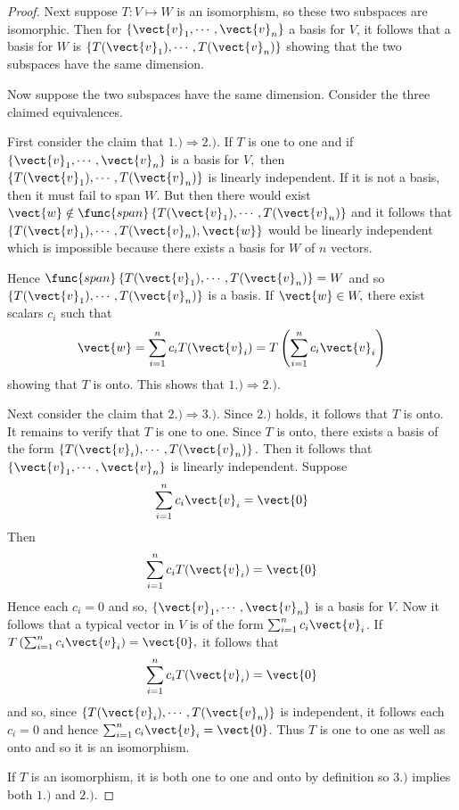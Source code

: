 \begin{proof}
Next suppose $T:V \mapsto W$ is an isomorphism, so these two subspaces are isomorphic. Then for $\left\{ \vect{v}_{1},\cdots ,\vect{v}_{n}\right\} $ a
basis for $V$, it follows that a basis for $W$
is $\left\{ T(\vect{v}_{1}),\cdots ,T(\vect{v}_{n})\right\} $ showing that the two
subspaces have the same dimension.

Now suppose the two subspaces have the same dimension. Consider the three
claimed equivalences.

First consider the claim that $1.)\Rightarrow 2.).$ If $T$ is one to one and if $\left\{ \vect{v}_{1},\cdots ,\vect{v}
_{n}\right\} $ is a basis for $V,$ then $\left\{ T(\vect{v}_{1}),\cdots ,T(\vect{v
}_{n})\right\} $ is linearly independent. If it is not a basis, then it must
fail to span $W$. But then there would exist $\vect{w}\notin \func{span}
\left\{ T(\vect{v}_{1}),\cdots ,T(\vect{v}_{n})\right\} $ and it follows that $\left\{ T(\vect{v}_{1}),\cdots ,T(\vect{v}_{n}),\vect{w}
\right\} $ would be linearly independent which is impossible because there exists a basis for $W$ of $n$ vectors.

Hence $\func{span}\left\{ T(\vect{v}_{1}),\cdots ,T(\vect{v}_{n})\right\} =W$ and
so $\left\{ T(\vect{v}_{1}),\cdots ,T(\vect{v}_{n})\right\} $ is a basis. If $\vect{w}\in W,$ there exist scalars $c_{i}$ such that 
\begin{equation*}
\vect{w}=\sum_{i=1}^{n}c_{i}T(\vect{v}_{i})=T\left( \sum_{i=1}^{n}c_{i}\vect{v}
_{i}\right)
\end{equation*}
showing that $T$ is onto. This shows that $1.)\Rightarrow 2.).$

Next consider the claim that $2.)\Rightarrow 3.).$ Since $2.)$ holds, it
follows that $T$ is onto. It remains to verify that $T$ is one to one. Since 
$T$ is onto, there exists a basis of the form $\left\{ T(\vect{v}_{i}),\cdots ,T(\vect{v}_{n})\right\} .$ Then it follows that $\left\{ \vect{v}_{1},\cdots ,
\vect{v}_{n}\right\} $ is linearly independent. Suppose 
\begin{equation*}
\sum_{i=1}^{n}c_{i}\vect{v}_{i}=\vect{0}
\end{equation*}
Then 
\begin{equation*}
\sum_{i=1}^{n}c_{i}T(\vect{v}_{i})=\vect{0}
\end{equation*}
Hence each $c_{i}=0$ and so, $\left\{ \vect{v}_{1},\cdots ,\vect{v}
_{n}\right\} $ is a basis for $V$. Now it follows that a typical vector in $
V $ is of the form $\sum_{i=1}^{n}c_{i}\vect{v}_{i}$. If $T\left(
\sum_{i=1}^{n}c_{i}\vect{v}_{i}\right) =\vect{0},$ it follows that 
\begin{equation*}
\sum_{i=1}^{n}c_{i}T(\vect{v}_{i})=\vect{0}
\end{equation*}
and so, since $\left\{ T(\vect{v}_{i}),\cdots ,T(\vect{v}_{n})\right\} $ is
independent, it follows each $c_{i}=0$ and hence $\sum_{i=1}^{n}c_{i}\vect{v}
_{i}=\vect{0}$. Thus $T$ is one to one as well as onto and so it is an
isomorphism.

If $T$ is an isomorphism, it is both one to one and onto by definition so $
3.)$ implies both $1.)$ and $2.)$.
\end{proof}

